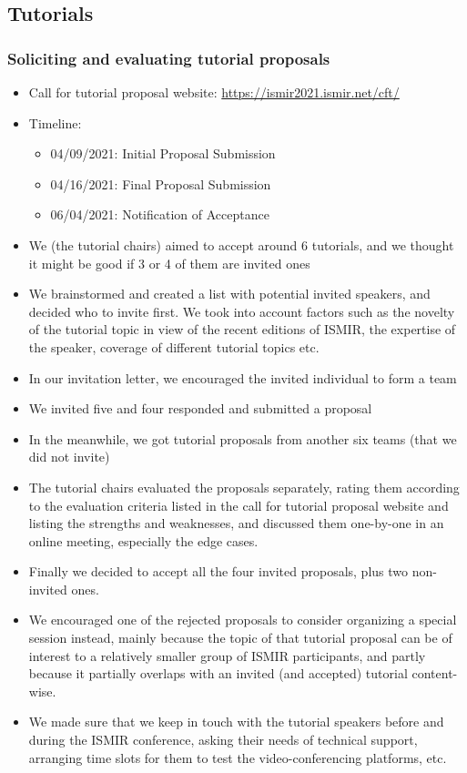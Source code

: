 \documentclass[%
10pt,								%
titlepage,						%
]
{scrartcl}
\begin{document}
    \subsection{Tutorials}
        \subsubsection{Soliciting and evaluating tutorial proposals}
            \begin{itemize}
                \item Call for tutorial proposal website: \href{https://ismir2021.ismir.net/cft/}{https://ismir2021.ismir.net/cft/}
                \item   Timeline:
                    \begin{itemize}
                        \item   04/09/2021: Initial Proposal Submission
                        \item   04/16/2021: Final Proposal Submission
                        \item   06/04/2021: Notification of Acceptance
                    \end{itemize}
                \item   We (the tutorial chairs) aimed to accept around 6 tutorials, and we thought it might be good if 3 or 4 of them are invited ones
                \item   We brainstormed and created a list with potential invited speakers, and decided who to invite first.  We took into account factors such as the novelty of the tutorial topic in view of the recent editions of ISMIR, the expertise of the speaker, coverage of different tutorial topics etc.
                \item   In our invitation letter, we encouraged the invited individual to form a team 
                \item   We invited five and four responded and submitted a proposal
                \item   In the meanwhile, we got tutorial proposals from another six teams (that we did not invite)
                \item   The tutorial chairs evaluated the proposals separately, rating them according to the evaluation criteria listed in the call for tutorial proposal website and listing the strengths and weaknesses, and discussed them one-by-one in an online meeting, especially the edge cases.
                \item   Finally we decided to accept all the four invited proposals, plus two non-invited ones.
                \item   We encouraged one of the rejected proposals to consider organizing a special session instead, mainly because the topic of that tutorial proposal can be of interest to a relatively smaller group of ISMIR participants, and partly because it partially overlaps with an invited (and accepted) tutorial content-wise.
                \item   We made sure that we keep in touch with the tutorial speakers before and during the ISMIR conference, asking their needs of technical support, arranging time slots for them to test the video-conferencing platforms, etc.


\end{itemize}
\end{document}
